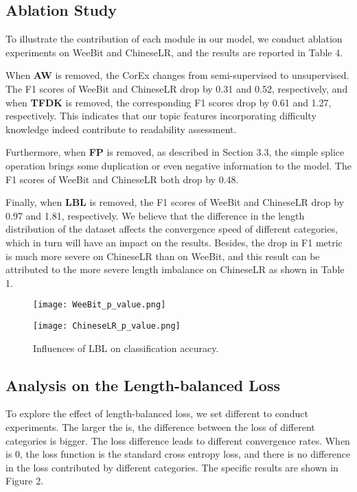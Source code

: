 \documentclass[11pt]{article}
\begin{document}
\subsection{Ablation Study}
To illustrate the contribution of each module in our model, we conduct ablation experiments on WeeBit and ChineseLR, and the results are reported in Table 4.


When \textbf{AW} is removed, the CorEx changes from semi-supervised to unsupervised. The F1 scores of WeeBit and ChineseLR drop by 0.31 and 0.52, respectively, and when \textbf{TFDK} is removed, the corresponding F1 scores drop by 0.61 and 1.27, respectively. This indicates that our topic features incorporating difficulty knowledge indeed contribute to readability assessment.


Furthermore, when \textbf{FP} is removed, as described in Section 3.3, the simple splice operation brings some duplication or even negative information to the model. The F1 scores of WeeBit and ChineseLR both drop by 0.48.


Finally, when \textbf{LBL} is removed, the F1 scores of WeeBit and ChineseLR drop by 0.97 and 1.81, respectively. We believe that the difference in the length distribution of the dataset affects the convergence speed of different categories, which in turn will have an impact on the results. Besides, 
the drop in F1 metric is much more severe on ChineseLR than on WeeBit, and this result can be attributed to the more severe length imbalance on ChineseLR as shown in Table 1.







\begin{figure*}
\begin{minipage}[t]{0.5\linewidth}
\centering
\texttt{[image: WeeBit\_p\_value.png]}
\label{fig:side:a}
\end{minipage}\begin{minipage}[t]{0.5\linewidth}
\centering
\texttt{[image: ChineseLR\_p\_value.png]}
\label{fig:side:b}
\end{minipage}
\caption{Influences of LBL on classification accuracy.}
\end{figure*}



\subsection{Analysis on the Length-balanced Loss}
To explore the effect of length-balanced loss, we set different  to conduct experiments. The larger the  is, the difference between the loss of different categories is bigger. The loss difference leads to different convergence rates.
When  is 0, the loss function is the standard cross entropy loss, and there is no difference in the loss contributed by different categories. The specific results are shown in Figure 2.
\end{document}
